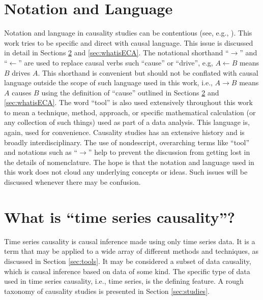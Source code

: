 \section{Notation and Language}
Notation and language in causality studies can be contentious (see, e.g., \cite{Illari2014,Pearl2000,Holland1986}).  This work tries to be specific and direct with causal language.  This issue is discussed in detail in Sections \ref{sec:whatis} and \ref{sec:whatisECA}.  The notational shorthand ``$\rightarrow$'' and ``$\leftarrow$'' are used to replace causal verbs such ``cause'' or ``drive'', e.g, $A\leftarrow B$ means $B$ drives $A$.  This shorthand is convenient but should not be conflated with causal language outside the scope of such language used in this work, i.e., $A\rightarrow B$ means $A$ causes $B$ using the definition of ``cause'' outlined in Sections \ref{sec:whatis} and \ref{sec:whatisECA}.  The word ``tool'' is also used extensively throughout this work to mean a technique, method, approach, or specific mathematical calculation (or any collection of such things) used as part of a data analysis.  This language is, again, used for convenience.  Causality studies has an extensive history and is broadly interdisciplinary.  The use of nondescript, overarching terms like ``tool'' and notations such as ``$\rightarrow$'' help to prevent the discussion from getting lost in the details of nomenclature.  The hope is that the notation and language used in this work does not cloud any underlying concepts or ideas.  Such issues will be discussed whenever there may be confusion.

\section{What is ``time series causality''?}
\label{sec:whatis}
Time series causality is causal inference made using only time series data.  It is a term that may be applied to a wide array of different methods and techniques, as discussed in Section \ref{sec:tools}.  It may be considered a subset of data causality, which is causal inference based on data of some kind.  The specific type of data used in time series causality, i.e., time series, is the defining feature.  A rough taxonomy of causality studies is presented in Section \ref{sec:studies}.

